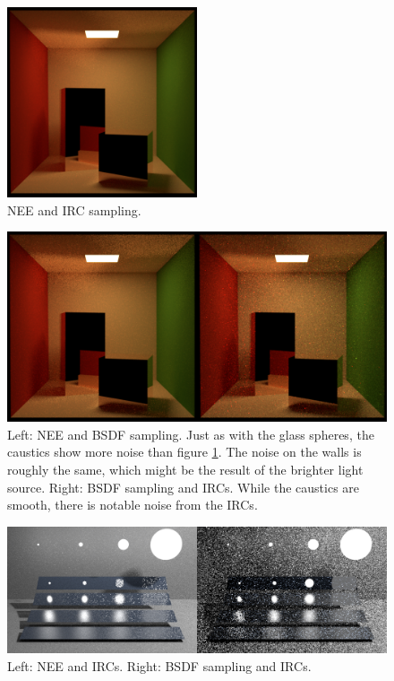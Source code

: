  \begin{figure}[h!]
 \centering
 \includegraphics[width=0.5\textwidth]{bilder/spiegelbox/nee&caches_150k20k1k_128spp.png}
\caption{NEE and IRC sampling.}
  \label{spiegel_nee_caches}\end{figure}

 \begin{figure}[h!]
 \centering
 \includegraphics[width=1\textwidth]{bilder/spiegelbox/bsdfcombos_128spp.png}
\caption{Left: NEE and BSDF sampling. Just as with the glass spheres, the caustics show more noise than figure \ref{spiegel_nee_caches}. The noise on the walls is roughly the same, which might be the result of the brighter light source.\newline
Right: BSDF sampling and IRCs. While the caustics are smooth, there is notable noise from the IRCs.}
  \label{spiegel_BSDF}\end{figure}


 \begin{figure}[h!]
 \centering
 \includegraphics[width=1\textwidth]{bilder/veach/cachecombos_64spp.png}
\caption{Left: NEE and IRCs. Right: BSDF sampling and IRCs.}
  \label{veach_ircs}\end{figure}

